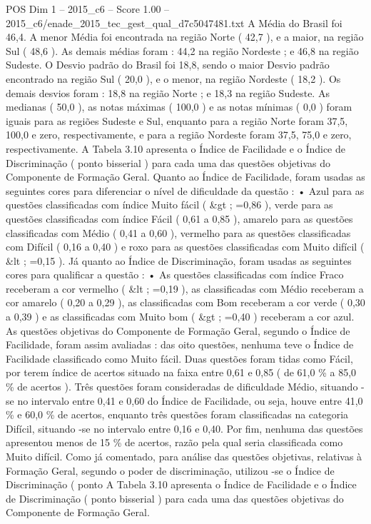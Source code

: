 \begin{textsample}{POS Dim 1 – 2015\_c6 – Score 1.00 – 2015\_c6/enade\_2015\_tec\_gest\_qual\_d7c5047481.txt}
A Média do Brasil foi 46,4.
A menor Média foi encontrada na região Norte ( 42,7 ), e a maior, na região Sul ( 48,6 ).
As demais médias foram : 44,2 na região Nordeste ; e 46,8 na região Sudeste.
O Desvio padrão do Brasil foi 18,8, sendo o maior Desvio padrão encontrado na região Sul ( 20,0 ), e o menor, na região Nordeste ( 18,2 ).
Os demais desvios foram : 18,8 na região Norte ; e 18,3 na região Sudeste.
As medianas ( 50,0 ), as notas máximas ( 100,0 ) e as notas mínimas ( 0,0 ) foram iguais para as regiões Sudeste e Sul, enquanto para a região Norte foram 37,5, 100,0 e zero, respectivamente, e para a região Nordeste foram 37,5, 75,0 e zero, respectivamente.
A Tabela 3.10 apresenta o Índice de Facilidade e o Índice de Discriminação ( ponto bisserial ) para cada uma das questões objetivas do Componente de Formação Geral.
Quanto ao Índice de Facilidade, foram usadas as seguintes cores para diferenciar o nível de dificuldade da questão : • Azul para as questões classificadas com índice Muito fácil ( \&gt ; =0,86 ), verde para as questões classificadas com índice Fácil ( 0,61 a 0,85 ), amarelo para as questões classificadas com Médio ( 0,41 a 0,60 ), vermelho para as questões classificadas com Difícil ( 0,16 a 0,40 ) e roxo para as questões classificadas com Muito difícil ( \&lt ; =0,15 ).
Já quanto ao Índice de Discriminação, foram usadas as seguintes cores para qualificar a questão : • As questões classificadas com índice Fraco receberam a cor vermelho ( \&lt ; =0,19 ), as classificadas com Médio receberam a cor amarelo ( 0,20 a 0,29 ), as classificadas com Bom receberam a cor verde ( 0,30 a 0,39 ) e as classificadas com Muito bom ( \&gt ; =0,40 ) receberam a cor azul.
As questões objetivas do Componente de Formação Geral, segundo o Índice de Facilidade, foram assim avaliadas : das oito questões, nenhuma teve o Índice de Facilidade classificado como Muito fácil.
Duas questões foram tidas como Fácil, por terem índice de acertos situado na faixa entre 0,61 e 0,85 ( de 61,0 \% a 85,0 \% de acertos ).
Três questões foram consideradas de dificuldade Médio, situando -se no intervalo entre 0,41 e 0,60 do Índice de Facilidade, ou seja, houve entre 41,0 \% e 60,0 \% de acertos, enquanto três questões foram classificadas na categoria Difícil, situando -se no intervalo entre 0,16 e 0,40.
Por fim, nenhuma das questões apresentou menos de 15 \% de acertos, razão pela qual seria classificada como Muito difícil.
Como já comentado, para análise das questões objetivas, relativas à Formação Geral, segundo o poder de discriminação, utilizou -se o Índice de Discriminação ( ponto A Tabela 3.10 apresenta o Índice de Facilidade e o Índice de Discriminação ( ponto bisserial ) para cada uma das questões objetivas do Componente de Formação Geral.

\end{textsample}
